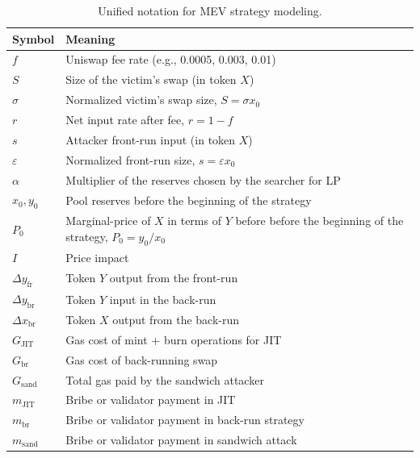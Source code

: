 \documentclass[a4paper,11pt]{article}
\begin{document}
\begin{table}[H]
\centering
\begin{tabular}{ll}
\hline
\textbf{Symbol} & \textbf{Meaning} \\
\hline
$f$ & Uniswap fee rate (e.g., 0.0005, 0.003, 0.01) \\ \hline
$S$ & Size of the victim's swap (in token $X$) \\ \hline
$\sigma$ & Normalized victim's swap size, $S = \sigma x_0$ \\ \hline
$r$ & Net input rate after fee, $r = 1 - f$ \\ \hline
$s$ & Attacker front-run input (in token $X$) \\ \hline
$\varepsilon$ & Normalized front-run size, $s = \varepsilon x_0$ \\ \hline
$\alpha$ & Multiplier of the reserves chosen by the searcher for LP \\ \hline
$x_0, y_0$ & Pool reserves before the beginning of the strategy \\ \hline
$P_0$ & Marginal-price of $X$ in terms of $Y$ before before the beginning of the strategy, $P_0 = y_0/x_0$ \\ \hline
$I$ & Price impact \\ \hline
$\Delta y_{\text{fr}}$ & Token $Y$ output from the front-run \\ \hline
$\Delta y_{\text{br}}$ & Token $Y$ input in the back-run \\ \hline
$\Delta x_{\text{br}}$ & Token $X$ output from the back-run \\ \hline
$G_{\text{JIT}}$ & Gas cost of mint + burn operations for JIT \\ \hline
$G_{\text{br}}$ & Gas cost of back-running swap \\ \hline
$G_{\text{sand}}$ & Total gas paid by the sandwich attacker \\ \hline
$m_{\text{JIT}}$ & Bribe or validator payment in JIT \\ \hline
$m_{\text{br}}$ & Bribe or validator payment in back-run strategy \\ \hline
$m_{\text{sand}}$ & Bribe or validator payment in sandwich attack \\ \hline
\end{tabular}
\caption{Unified notation for MEV strategy modeling.}
\label{tab:notation}
\end{table}
\end{document}
